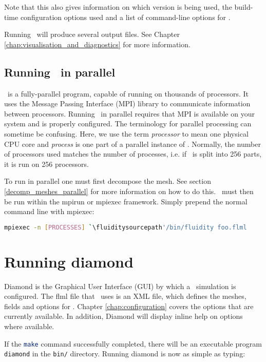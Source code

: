 Note that this also gives information on which version is being used, the
build-time configuration options used and a list of command-line options for
\fluidity.

Running \fluidity\ will produce several output files. See Chapter \ref{chap:visualisation_and_diagnostics}
for more information.

\subsection{Running \fluidity\ in parallel}
\label{sec:running_fluidity_in_parallel}

\fluidity\ is a fully-parallel program, capable of running on thousands of
processors.  It uses the Message Passing Interface (MPI) library to communicate
information between processors. Running \fluidity\ in parallel requires that
MPI is available on your system and is properly configured. The terminology for
parallel processing can sometime be confusing.  Here, we use the term
\emph{processor} to mean one physical CPU core and \emph{process} is one part
of a parallel instance of \fluidity. Normally, the number of processors used
matches the number of processes, i.e. if \fluidity\ is split into 256 parts, it
is run on 256 processors.

To run in parallel one must first decompose the mesh. See section
\ref{decomp_meshes_parallel} for more information on how to do this. \fluidity\
must then be run within the mpirun or mpiexec framework. Simply prepend the
normal command line with mpiexec:
\begin{lstlisting}[language=bash]
mpiexec -n [PROCESSES] `\fluiditysourcepath'/bin/fluidity foo.flml
\end{lstlisting}

\section{Running diamond}
\label{sec:running_diamond}

Diamond is the Graphical User Interface (GUI) by which a \fluidity\ simulation
is configured. The flml file that \fluidity\ uses is an XML file, which defines
the meshes, fields and options for \fluidity. Chapter \ref{chap:configuration}
covers the options that are currently available. In addition, Diamond will
display inline help on options where available.

If the \lstinline[language=Bash]+make+ command successfully completed, there
will be an executable program \lstinline[language=Bash]+diamond+ in the
\lstinline[language=Bash]+bin/+ directory. Running diamond is now as simple as
typing:

